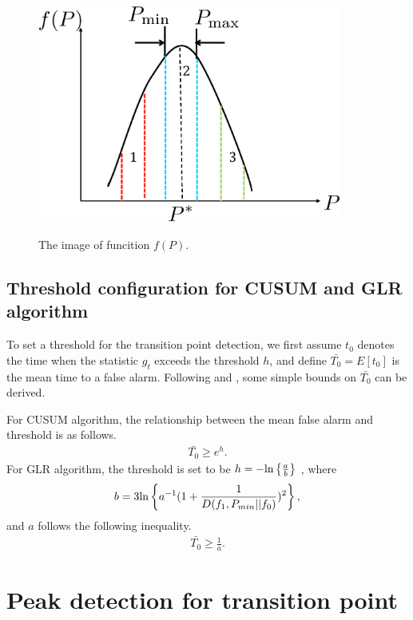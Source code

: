 \begin{center}
  \begin{figure}[t]
    \centering
    \includegraphics[width=100mm]{fp.eps}
    \label{concave}
    \caption{The image of funcition $f(P)$.}
  \end{figure}
\end{center} 

\subsection{Threshold configuration for CUSUM and GLR algorithm}
To set a threshold for the transition point detection, we first assume $t_0$ denotes the time when the statistic $g_t$ exceeds the threshold $h$, and define $\bar{T_0}=E[t_0]$ is the mean time to a false alarm. Following \cite{ref:threshold_cusum} and \cite{ref:threshold_GLR}, some simple bounds on $\bar{T_0}$ can be derived.

For CUSUM algorithm, the relationship between the mean false alarm and threshold is as follows.
\begin{eqnarray}
\bar{T_0} \geq e^h.
\end{eqnarray}
For GLR algorithm, the threshold is set to be $h=-{\rm ln}\left\{\frac{a}{b}\right\}$ , where 
\begin{eqnarray}
b=3{\rm ln}\left\{a^{-1}(1+\frac{1}{D(f_1,P_{min}||f_0)})^2\right\},
\end{eqnarray}
and $a$ follows the following inequality.
\begin{eqnarray}
\bar{T_0} \geq \frac{1}{a}.
\end{eqnarray}

\section{Peak detection for transition point}


